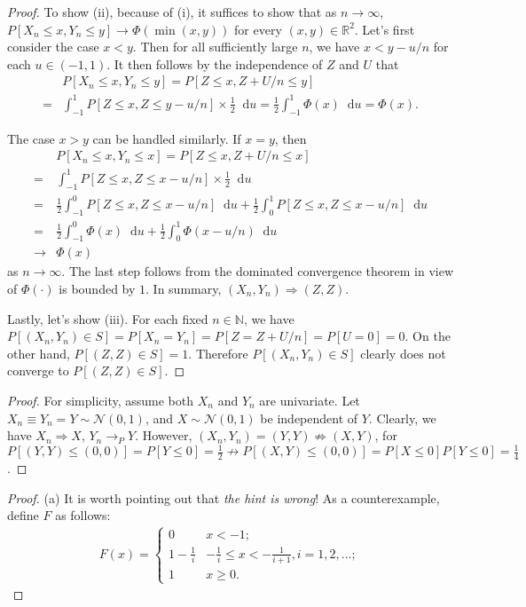 \documentclass{article}
\newcommand{\real}{\mathbb{R}}
\newcommand{\nn}{\mathbb{N}}
\newcommand{\dd}{\mathop{}\!\mathrm{d}}
\theoremstyle{definition}
\theoremstyle{plain}
\theoremstyle{remark}
\begin{document}
\begin{description}
\begin{proof}
To show (ii), because of (i), it suffices to show that as $n \to \infty$,
$P[X_n \leq x, Y_n \leq y] \to \Phi(\min(x, y))$ for every $(x, y) \in 
\real^2$. Let's first consider the case $x < y$. Then for all sufficiently
large $n$, we have $x < y - u/n$ for each $u \in (-1, 1)$. It then follows by
the independence of $Z$ and $U$ that 
\begin{align*}
& P[X_n \leq x, Y_n \leq y] = P[Z \leq x, Z + U/n \leq y] \\
= & \int_{-1}^1 P[Z \leq x, Z \leq y - u/n] \times \frac{1}{2} \dd u 
= \frac{1}{2}\int_{-1}^1 \Phi(x) \dd u = \Phi(x).
\end{align*}

The case $x > y$ can be handled similarly. If $x = y$, then
\begin{align*}
& P[X_n \leq x, Y_n \leq x] = P[Z \leq x, Z + U/n \leq x] \\
= & \int_{-1}^1 P[Z \leq x, Z \leq x - u/n] \times \frac{1}{2} \dd u \\
= & \frac{1}{2}\int_{-1}^0 P[Z \leq x, Z \leq x - u/n] \dd u 
+ \frac{1}{2}\int_0^1 P[Z \leq x, Z \leq x - u/n] \dd u \\
= & \frac{1}{2}\int_{-1}^0 \Phi(x) \dd u
+ \frac{1}{2} \int_0^1 \Phi(x - u/n) \dd u \\
\to & \Phi(x)
\end{align*}
as $n \to \infty$. The last step follows from the dominated convergence 
theorem in view of $\Phi(\cdot)$ is bounded by $1$. In summary, $(X_n, Y_n) 
\Rightarrow (Z, Z)$. 

Lastly, let's show (iii). For each fixed $n \in \nn$, 
we have $P[(X_n, Y_n) \in S] = P[X_n = Y_n] = P[Z = Z + U/n] = P[U = 0] = 0$. 
On the other hand,
$P[(Z, Z) \in S] = 1$. Therefore $P[(X_n, Y_n) \in S]$ clearly does not 
converge to $P[(Z, Z) \in S]$. 
\end{proof}

\item[2.21]
\begin{proof}
For simplicity, assume both $X_n$ and $Y_n$ are univariate. Let $X_n \equiv Y_n = Y \sim \mathcal{N}(0, 1)$, and $X \sim \mathcal{N}(0, 1)$ be independent of $Y$. Clearly, we have $X_n \Rightarrow X$, $Y_n \to_P Y$. However, $(X_n, Y_n) = (Y, Y) \not\Rightarrow (X, Y)$, for $P[(Y, Y) \leq (0, 0)] = P[Y \leq 0] = \frac{1}{2} \not\to P[(X, Y) \leq (0, 0)] = P[X \leq 0]P[Y \leq 0] = \frac{1}{4}$.
\end{proof}

\item[2.24]
\begin{proof}
\item[(a)] It is worth pointing out that \emph{\color{red}the hint is wrong}! As a counterexample, define $F$ as follows:
\begin{align*}
F(x) = \begin{cases}
0 & x < -1; \\[1ex]
1 - \frac{1}{i} & -\frac{1}{i} \leq x < -\frac{1}{i + 1}, i = 1, 2, \ldots;  \\[1ex]
1 & x \geq 0.
\end{cases}
\end{align*}


\end{proof}
\end{description}
\end{document}
